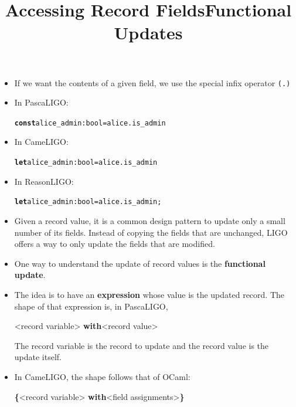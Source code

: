 \documentclass[wide]{slides}
\newcommand{\Kconst}[0]{\textbf{const}\xspace}
\newcommand{\Kwith}[0]{\textbf{with}\xspace}
\newcommand{\Klet}[0]{\textbf{let}\xspace}
\begin{document}
\begin{slide}
  \title{Accessing Record Fields}

  \begin{itemize}

    \item If we want the contents of a given field, we use the
      special infix operator \texttt{(.)}

    \item In PascaLIGO:
      \begin{alltt}
\Kconst alice_admin : bool = alice.is_admin
      \end{alltt}

    \item In CameLIGO:
      \begin{alltt}
\Klet alice_admin : bool = alice.is_admin
      \end{alltt}

    \item In ReasonLIGO:
      \begin{alltt}
\Klet alice_admin : bool = alice.is_admin;
      \end{alltt}

  \end{itemize}

\end{slide}

\begin{slide}
  \title{Functional Updates}

  \begin{itemize}

    \item Given a record value, it is a common design pattern to
      update only a small number of its fields. Instead of copying the
      fields that are unchanged, LIGO offers a way to only update the
      fields that are modified.

    \item One way to understand the update of record values is the
      \textbf{functional update}.

    \item The idea is to have an \textbf{expression} whose value is
      the updated record. The shape of that expression is, in
      PascaLIGO,
      \begin{center}
        <record variable> \Kwith <record value>
      \end{center}
      The record variable is the record to update and the record value
      is the update itself.

    \item In CameLIGO, the shape follows that of OCaml:
      \begin{center}
        \textbf{\{}<record variable> \Kwith <field assignments>\textbf{\}}
      \end{center}

  \end{itemize}

\end{slide}
\end{document}
